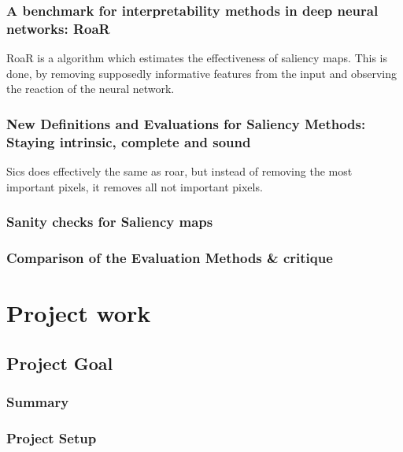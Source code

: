 \subsection{A benchmark for interpretability methods in deep neural networks: RoaR}

RoaR is a algorithm which estimates the effectiveness of saliency maps. This is done, by removing supposedly informative features from the input and observing the reaction of the neural network.


\subsection{New Definitions and Evaluations for Saliency Methods: Staying intrinsic, complete and sound}

Sics does effectively the same as roar, but instead of removing the most important pixels, it removes all not important pixels.


\subsection{Sanity checks for Saliency maps}



\subsection{Comparison of the Evaluation Methods \& critique}





\chapter{Project work} %

\section{Project Goal}

\subsection{Summary}

\subsection{Project Setup}
